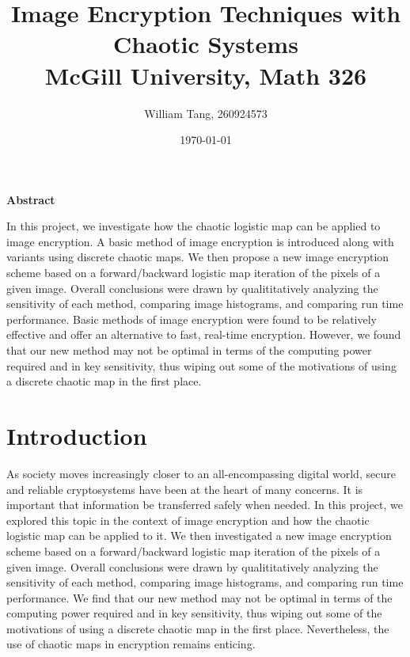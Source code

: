 \documentclass[10pt]{article}
\renewenvironment{abstract}%
{\centerline{\large\bf Abstract}%
    \begin{list}{}%
        {\setlength{\rightmargin}{0.6cm}%
            \setlength{\leftmargin}{0.6cm}}%
        \item[]\ignorespaces%
        \small
    }%
    {\unskip\end{list}}
\begin{document}
    \title{Image Encryption Techniques with Chaotic Systems\\
        \large McGill University, Math 326} 
    
    \author{William Tang, 260924573} 
    
    \date{\today}
    
    \maketitle
    
    
    
    \begin{abstract}
        In this project, we investigate how the chaotic logistic map can be applied to image encryption. A basic method of image encryption is introduced along with variants using discrete chaotic maps. We then propose a new image encryption scheme based on a forward/backward logistic map iteration of the pixels of a given image. Overall conclusions were drawn by qualititatively analyzing the sensitivity of each method, comparing image histograms, and comparing run time performance. Basic methods of image encryption were found to be relatively effective and offer an alternative to fast, real-time encryption. However, we found that our new method may not be optimal in terms of the computing power required and in key sensitivity, thus wiping out some of the motivations of using a discrete chaotic map in the first place. 
    \end{abstract}
    
    \section{Introduction}
    
    As society moves increasingly closer to an all-encompassing digital world, secure and reliable cryptosystems have been at the heart of many concerns. It is important that information be transferred safely when needed. In this project, we explored this topic in the context of image encryption and how the chaotic logistic map can be applied to it. We then investigated a new image encryption scheme based on a forward/backward logistic map iteration of the pixels of a given image. Overall conclusions
    were drawn by qualititatively analyzing the sensitivity of each method, comparing image histograms, and comparing run time performance. We find that our new method may not be optimal in terms of the computing power required and in key sensitivity, thus wiping out some of the motivations of using a discrete chaotic map in the first place. Nevertheless, the use of chaotic maps in encryption remains enticing.
    
\end{document}
